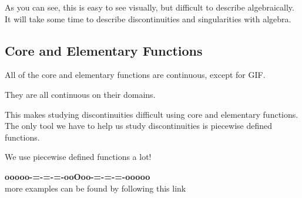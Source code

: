 \documentclass{ximera}
\begin{document}
As you can see, this is easy to see visually, but difficult to describe algebraically.  It will take some time to describe discontinuities and singularities with algebra.







\subsection*{Core and Elementary Functions}


All of the core and elementary functions are continuous, except for GIF.


They are all continuous on their domains.

This makes studying discontinuities difficult using core and elementary functions.  The only tool we have to help us study discontinuities is piecewise defined functions.

We use piecewise defined functions a lot!










\begin{onlineOnly}
\begin{center}
\textbf{\textcolor{green!50!black}{ooooo-=-=-=-ooOoo-=-=-=-ooooo}} \\

more examples can be found by following this link\\ 

\end{center}
\end{onlineOnly}
\end{document}

